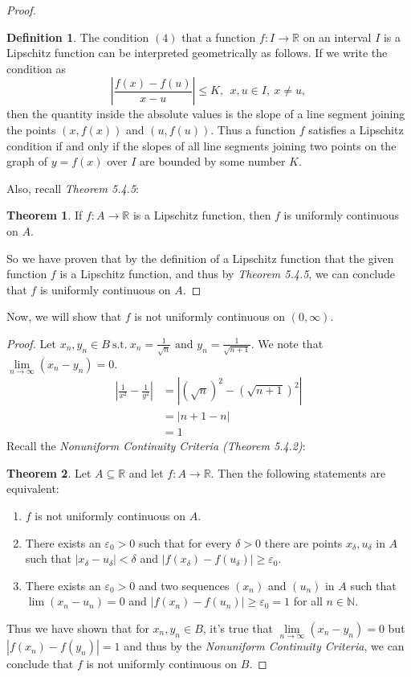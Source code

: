 \documentclass[12pt,letterpaper]{article}
\newcommand{\st}{\ \text{s.t.}\ }
\newcommand{\abs}[1]{\left\lvert #1 \right\rvert}
\newcommand{\R}{\mathbb{R}}
\newcommand{\N}{\mathbb{N}}
\theoremstyle{case}
\theoremstyle{definition}
\newtheorem{definition}{Definition}[section]
\newtheorem*{theorem*}{Theorem}
\begin{document}
\begin{enumerate}
\begin{enumerate}
\begin{proof}
\begin{definition}
						The condition $(4)$ that a function $f:I \to \R$ on an interval $I$ is a Lipschitz function can be interpreted geometrically as follows. If we write the condition as
						\[\abs{\frac{f(x)-f(u)}{x-u}}\leq K,\ \ x,u \in I,\ x \neq u,\]
						then the quantity inside the absolute values is the slope of a line segment joining the points $(x,f(x))$ and $(u,f(u))$. Thus a function $f$ satisfies a Lipschitz condition if and only if the slopes of all line segments joining two points on the graph of $y=f(x)$ over $I$ are bounded by some number $K$.
					\end{definition}
					Also, recall \textit{Theorem 5.4.5}:
					\begin{theorem*}
						If $f:A \rightarrow \R$ is a Lipschitz function, then $f$ is uniformly continuous on $A$.
					\end{theorem*}
					So we have proven that by the definition of a Lipschitz function that the given function $f$ is a Lipschitz function, and thus by \textit{Theorem 5.4.5}, we can conclude that $f$ is uniformly continuous on $A$.
				\end{proof}
				Now, we will show that $f$ is not uniformly continuous on $(0, \infty)$.
				\begin{proof}
					Let $x_n,y_n \in B \st x_n=\frac{1}{\sqrt{n}} \text{ and } y_n=\frac{1}{\sqrt{n+1}}$. We note that $\lim\limits_{n \to \infty} (x_n-y_n)=0$.
					\begin{align*}
						\abs{\frac{1}{x^2}-\frac{1}{y^2}} &= |(\sqrt{n})^2 - (\sqrt{n+1})^2| \\
						&=|n+1-n| \\
						&=1
					\end{align*}
					Recall the \textit{Nonuniform Continuity Criteria (Theorem 5.4.2)}:
					\begin{theorem*}
						Let $A \subseteq \R$ and let $f:A \rightarrow \R$. Then the following statements are equivalent:
						\begin{enumerate}
							\item $f$ is not uniformly continuous on $A$.
							
							\item There exists an $\varepsilon_0 > 0$ such that for every $\delta > 0$ there are points $x_\delta, u_\delta$ in $A$ such that $|x_\delta - u_\delta|<\delta$ and $|f(x_\delta) - f(u_\delta)| \geq \varepsilon_0$.
							
							\item There exists an $\varepsilon_0 > 0$ and two sequences $(x_n)$ and $(u_n)$ in $A$ such that $\lim (x_n - u_n)=0$ and $|f(x_n)-f(u_n)|\geq \varepsilon_0=1$ for all $n \in \N$.
						\end{enumerate}
					\end{theorem*}
					Thus we have shown that for $x_n, y_n \in B$, it's true that $\lim\limits_{n \to \infty} (x_n-y_n)=0$ but $|f(x_n)-f(y_n)|=1$ and thus by the \textit{Nonuniform Continuity Criteria}, we can conclude that $f$ is not uniformly continuous on $B$.
				\end{proof}
				

\end{enumerate}
\end{enumerate}
\end{document}
